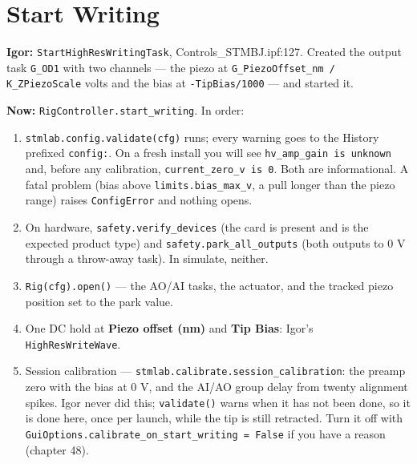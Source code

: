 \section{Start Writing}

\textbf{Igor:} \texttt{Start\discretionary{}{}{}High\discretionary{}{}{}Res\discretionary{}{}{}Writing\discretionary{}{}{}Task}, Controls\_STMBJ.ipf:127. Created the output task \texttt{G\_\discretionary{}{}{}OD1} with two channels --- the piezo at \texttt{G\_\discretionary{}{}{}Piezo\discretionary{}{}{}Offset\_\discretionary{}{}{}nm /\discretionary{}{}{} K\_\discretionary{}{}{}ZPiezo\discretionary{}{}{}Scale} volts and the bias at \texttt{-Tip\discretionary{}{}{}Bias/\discretionary{}{}{}1000} --- and started it.

\textbf{Now:} \texttt{Rig\discretionary{}{}{}Controller.\discretionary{}{}{}start\_\discretionary{}{}{}writing}. In order:

\begin{enumerate}[leftmargin=*]
\item \texttt{stmlab.\discretionary{}{}{}config.\discretionary{}{}{}validate(cfg)} runs; every warning goes to the History prefixed \texttt{config:}. On a fresh install you will see \texttt{hv\_\discretionary{}{}{}amp\_\discretionary{}{}{}gain is unknown} and, before any calibration, \texttt{current\_\discretionary{}{}{}zero\_\discretionary{}{}{}v is 0}. Both are informational. A fatal problem (bias above \texttt{limits.\discretionary{}{}{}bias\_\discretionary{}{}{}max\_\discretionary{}{}{}v}, a pull longer than the piezo range) raises \texttt{Config\discretionary{}{}{}Error} and nothing opens.
\item On hardware, \texttt{safety.\discretionary{}{}{}verify\_\discretionary{}{}{}devices} (the card is present and is the expected product type) and \texttt{safety.\discretionary{}{}{}park\_\discretionary{}{}{}all\_\discretionary{}{}{}outputs} (both outputs to 0 V through a throw-away task). In simulate, neither.
\item \texttt{Rig(cfg).\discretionary{}{}{}open()} --- the AO/AI tasks, the actuator, and the tracked piezo position set to the park value.
\item One DC hold at \textbf{Piezo offset (nm)} and \textbf{Tip Bias}: Igor's \texttt{High\discretionary{}{}{}Res\discretionary{}{}{}Write\discretionary{}{}{}Wave}.
\item Session calibration --- \texttt{stmlab.\discretionary{}{}{}calibrate.\discretionary{}{}{}session\_\discretionary{}{}{}calibration}: the preamp zero with the bias at 0 V, and the AI/AO group delay from twenty alignment spikes. Igor never did this; \texttt{validate()} warns when it has not been done, so it is done here, once per launch, while the tip is still retracted. Turn it off with \texttt{Gui\discretionary{}{}{}Options.\discretionary{}{}{}calibrate\_\discretionary{}{}{}on\_\discretionary{}{}{}start\_\discretionary{}{}{}writing = False} if you have a reason (chapter 48).
\end{enumerate}

